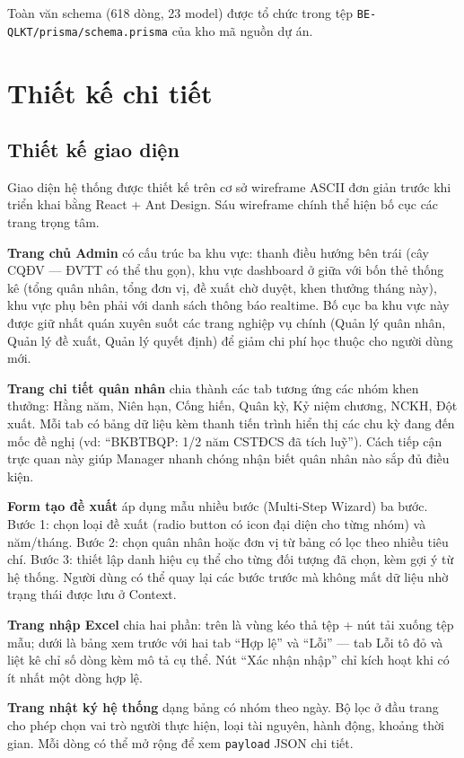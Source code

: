 \documentclass[../DoAn.tex]{subfiles}
\begin{document}
Toàn văn schema (618 dòng, 23 model) được tổ chức trong tệp \texttt{BE-QLKT/prisma/schema.prisma} của kho mã nguồn dự án.

\section{Thiết kế chi tiết}
\label{section:4.2}

\subsection{Thiết kế giao diện}
\label{subsection:4.2.1}

Giao diện hệ thống được thiết kế trên cơ sở wireframe ASCII đơn giản trước khi triển khai bằng React + Ant Design. Sáu wireframe chính thể hiện bố cục các trang trọng tâm.

\textbf{Trang chủ Admin} có cấu trúc ba khu vực: thanh điều hướng bên trái (cây CQĐV --- ĐVTT có thể thu gọn), khu vực dashboard ở giữa với bốn thẻ thống kê (tổng quân nhân, tổng đơn vị, đề xuất chờ duyệt, khen thưởng tháng này), khu vực phụ bên phải với danh sách thông báo realtime. Bố cục ba khu vực này được giữ nhất quán xuyên suốt các trang nghiệp vụ chính (Quản lý quân nhân, Quản lý đề xuất, Quản lý quyết định) để giảm chi phí học thuộc cho người dùng mới.

\textbf{Trang chi tiết quân nhân} chia thành các tab tương ứng các nhóm khen thưởng: Hằng năm, Niên hạn, Cống hiến, Quân kỳ, Kỷ niệm chương, NCKH, Đột xuất. Mỗi tab có bảng dữ liệu kèm thanh tiến trình hiển thị các chu kỳ đang đến mốc đề nghị (vd: ``BKBTBQP: 1/2 năm CSTĐCS đã tích luỹ''). Cách tiếp cận trực quan này giúp Manager nhanh chóng nhận biết quân nhân nào sắp đủ điều kiện.

\textbf{Form tạo đề xuất} áp dụng mẫu nhiều bước (Multi-Step Wizard) ba bước. Bước 1: chọn loại đề xuất (radio button có icon đại diện cho từng nhóm) và năm/tháng. Bước 2: chọn quân nhân hoặc đơn vị từ bảng có lọc theo nhiều tiêu chí. Bước 3: thiết lập danh hiệu cụ thể cho từng đối tượng đã chọn, kèm gợi ý từ hệ thống. Người dùng có thể quay lại các bước trước mà không mất dữ liệu nhờ trạng thái được lưu ở Context.

\textbf{Trang nhập Excel} chia hai phần: trên là vùng kéo thả tệp + nút tải xuống tệp mẫu; dưới là bảng xem trước với hai tab ``Hợp lệ'' và ``Lỗi'' --- tab Lỗi tô đỏ và liệt kê chỉ số dòng kèm mô tả cụ thể. Nút ``Xác nhận nhập'' chỉ kích hoạt khi có ít nhất một dòng hợp lệ.

\textbf{Trang nhật ký hệ thống} dạng bảng có nhóm theo ngày. Bộ lọc ở đầu trang cho phép chọn vai trò người thực hiện, loại tài nguyên, hành động, khoảng thời gian. Mỗi dòng có thể mở rộng để xem \texttt{payload} JSON chi tiết.
\end{document}
